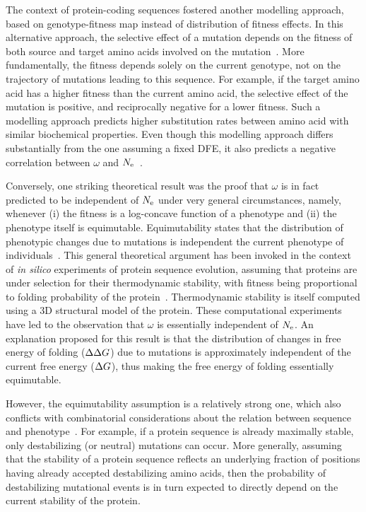 The context of protein-coding sequences fostered another modelling approach, based on genotype-fitness map instead of distribution of fitness effects.
In this alternative approach, the selective effect of a mutation depends on the fitness of both source and target amino acids involved on the mutation~\citep{Halpern1998, Rodrigue2010, Tamuri2012}.
More fundamentally, the fitness depends solely on the current genotype, not on the trajectory of mutations leading to this sequence.
For example, if the target amino acid has a higher fitness than the current amino acid, the selective effect of the mutation is positive, and reciprocally negative for a lower fitness.
Such a modelling approach predicts higher substitution rates between amino acid with similar biochemical properties.
Even though this modelling approach differs substantially from the one assuming a fixed \acrshort{DFE}, it also predicts a negative correlation between $\omega$ and $N_{\mathrm{e}}$~\citep{Spielman2015, DosReis2015}.

Conversely, one striking theoretical result was the proof that $\omega$ is in fact predicted to be independent of $N_{\mathrm{e}}$ under very general circumstances, namely, whenever (i) the fitness is a log-concave function of a phenotype and (ii) the phenotype itself is equimutable.
Equimutability states that the distribution of phenotypic changes due to mutations is independent the current phenotype of individuals~\citep{Cherry1998}.
This general theoretical argument has been invoked in the context of \textit{in silico} experiments of protein sequence evolution, assuming that proteins are under selection for their thermodynamic stability, with fitness being proportional to folding probability of the protein~\citep{Goldstein2013}.
Thermodynamic stability is itself computed using a 3D structural model of the protein.
These computational experiments have led to the observation that $\omega$ is essentially independent of $N_{\mathrm{e}}$.
An explanation proposed for this result is that the distribution of changes in free energy of folding ($\Delta \Delta G$) due to mutations is approximately independent of the current free energy ($\Delta G$), thus making the free energy of folding essentially equimutable.

However, the equimutability assumption is a relatively strong one, which also conflicts with combinatorial considerations about the relation between sequence and phenotype~\citep{Serohijos2012}.
For example, if a protein sequence is already maximally stable, only destabilizing (or neutral) mutations can occur.
More generally, assuming that the stability of a protein sequence reflects an underlying fraction of positions having already accepted destabilizing amino acids, then the probability of destabilizing mutational events is in turn expected to directly depend on the current stability of the protein.

